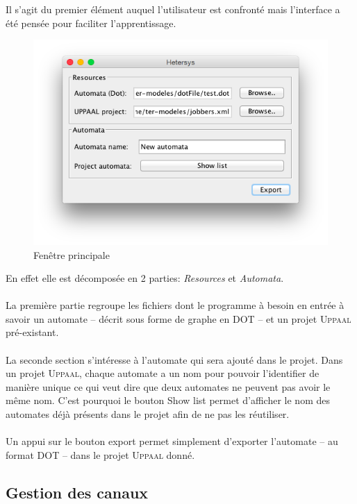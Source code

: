 \documentclass[12pt,a4paper]{report}
\begin{document}
Il s'agit du premier élément auquel l'utilisateur est confronté mais l'interface a été 
pensée pour faciliter l'apprentissage.

\begin{figure}[!h]
  \centering
  \includegraphics[scale=0.6]{ressources/gui/home.png}
  \caption{Fenêtre principale}
\end{figure}

En effet elle est décomposée en 2 parties: \emph{Resources} et \emph{Automata}. 
\\\\
La première partie regroupe les fichiers dont le programme à besoin en entrée à savoir 
un automate -- décrit sous forme de graphe en DOT -- et un projet \textsc{Uppaal} pré-existant.
\\\\
La seconde section s'intéresse à l'automate qui sera ajouté dans le projet. Dans un projet
\textsc{Uppaal}, chaque automate a un nom pour pouvoir l'identifier de manière unique ce qui veut
dire que deux automates ne peuvent pas avoir le même nom. C'est pourquoi le bouton 
\og{}Show list\fg{} permet d'afficher le nom des automates déjà présents dans le projet 
afin de ne pas les réutiliser.
\\\\
Un appui sur le bouton export permet simplement d'exporter l'automate -- au format DOT -- 
dans le projet \textsc{Uppaal} donné.

\subsection{Gestion des canaux}
\end{document}
